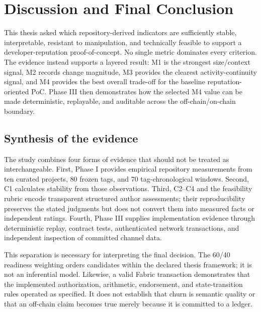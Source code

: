 \section{Discussion and Final Conclusion}
\label{sec:final_discussion_conclusion}

This thesis asked which repository-derived indicators are sufficiently stable, interpretable, resistant to manipulation,
and technically feasible to support a developer-reputation proof-of-concept. No single metric dominates every criterion.
The evidence instead supports a layered result: M1 is the strongest size/context signal, M2 records change
magnitude, M3 provides the clearest activity-continuity signal, and M4 provides the best overall trade-off for the baseline
reputation-oriented PoC. Phase III then demonstrates how the selected M4 value can be made deterministic, replayable, and
auditable across the off-chain/on-chain boundary.

\subsection{Synthesis of the evidence}
\label{sec:final_evidence_synthesis}

The study combines four forms of evidence that should not be treated as interchangeable. First, Phase I provides empirical
repository measurements from ten curated projects, 80 frozen tags, and 70 tag-chronological windows. Second, C1 calculates
stability from those observations. Third, C2--C4 and the feasibility rubric encode transparent structured author assessments;
their reproducibility preserves the stated judgments but does not convert them into measured facts or independent ratings.
Fourth, Phase III supplies implementation evidence through deterministic replay, contract tests, authenticated network
transactions, and independent inspection of committed channel data.

This separation is necessary for interpreting the final decision. The 60/40 readiness weighting orders candidates within the
declared thesis framework; it is not an inferential model. Likewise, a valid Fabric transaction demonstrates that the
implemented authorization, arithmetic, endorsement, and state-transition rules operated as specified. It does not establish
that churn is semantic quality or that an off-chain claim becomes true merely because it is committed to a ledger.

